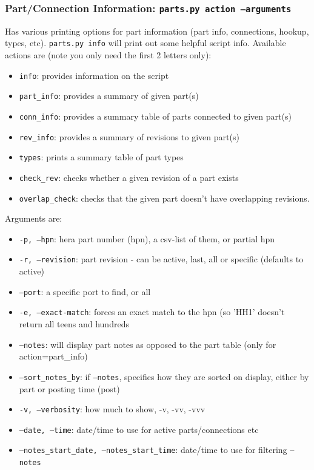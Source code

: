 \documentclass{article}
\begin{document}
{\subsubsection{Part/Connection Information: {\tt parts.py action --arguments}}
Has various printing options for part information (part info, connections, hookup, types, etc). {\tt parts.py info} will print out some helpful script info. Available actions are (note you only need the first 2 letters only):
\begin{itemize}\setlength\itemsep{-.3em}
\item {\tt info}:   provides information on the script
\item {\tt part\_info}:   provides a summary of given part(s)
\item {\tt conn\_info}:   provides a summary table of parts connected to given part(s)
\item {\tt rev\_info}:  provides a summary of revisions to given part(s)
\item {\tt types}:  prints a summary table of part types
\item {\tt check\_rev}:  checks whether a given revision of a part exists
\item {\tt overlap\_check}:  checks that the given part doesn't have overlapping revisions.
\end{itemize}

Arguments are:
\begin{itemize}\setlength\itemsep{-.3em}
\item {\tt -p, --hpn}:  hera part number (hpn), a csv-list of them, or partial hpn
\item {\tt -r, --revision}: part revision - can be active, last, all or specific (defaults to active)
\item {\tt --port}: a specific port to find, or all
\item {\tt -e, --exact-match}: forces an exact match to the hpn (so 'HH1' doesn't return all teens and hundreds
\item {\tt --notes}: will display part notes as opposed to the part table (only for action=part\_info)
\item {\tt --sort\_notes\_by}:  if {\tt --notes}, specifies how they are sorted on display, either by part or posting time (post)
\item {\tt -v, --verbosity}:  how much to show, -v, -vv, -vvv
\item {\tt --date, --time}:  date/time to use for active parts/connections etc
\item {\tt --notes\_start\_date, --notes\_start\_time}:  date/time to use for filtering {\tt --notes}
\end{itemize}

}
\end{document}
